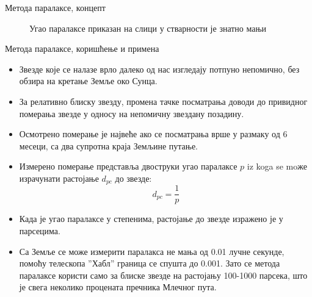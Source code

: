 \documentclass[aspectratio=169, xcolor=table, 10pt]{beamer}
\begin{document}
\begin{frame}{Метода паралаксе, концепт}
  \begin{figure}
    \centering
    \captionsetup{width=\wd0}
    \caption{Угао паралаксе приказан на слици у стварности је знатно мањи}
  \end{figure}
\end{frame}

\begin{frame}{Метода паралаксе, коришћење и примена}
  \begin{itemize}
    \item Звезде које се налазе врло далеко од нас изгледају потпуно непомично, без обзира на кретање Земље око Сунца.
    \item За релативно блиску звезду, промена тачке посматрања доводи до привидног померања звезде у односу на непомичну звездану позадину\cite{dina}.
    \item Осмотрено померање је највеће ако се посматрања врше у размаку од 6 месеци, са два супротна краја Земљине путање.
    \item Измерено померање представља двоструки угао паралаксе $p$ iz koga se moже израчунати растојање $d_{pc}$ до звезде:
      \begin{equation*}
        d_{pc}=\frac{1}{p}
      \end{equation*}
    \item Када је угао паралаксе у степенима, растојање до звезде изражено је у парсецима.
    \item Са Земље се може измерити паралакса не мања од 0.01 лучне секунде, помоћу телескопа ”Хабл” граница се спушта до 0.001. Зато се метода паралаксе користи само за блиске звезде на растојању 100-1000 парсека, што је свега неколико процената пречника Млечног пута.
  \end{itemize}
\end{frame}
\end{document}
